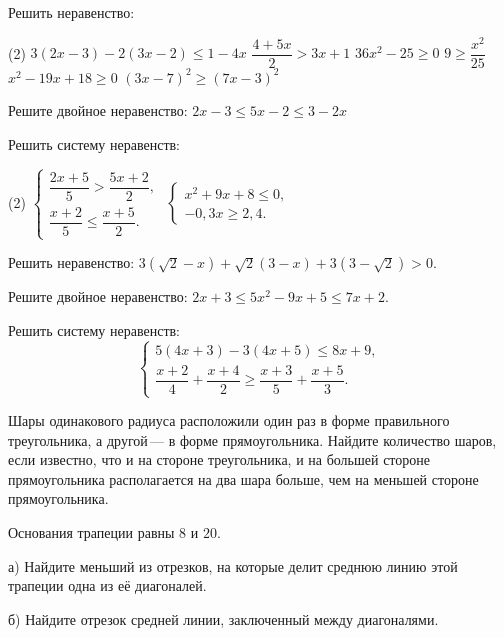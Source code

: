 \begin{class}[number=5]
	\begin{listofex}
		\item Решить неравенство:
		\begin{tasks}(2)
			\task \( 3(2x-3)-2(3x-2)\le1-4x \)
			\task \( \dfrac{4+5x}{2}>3x+1 \)
			\task \( 36x^2-25\ge0 \)
			\task \( 9\ge\dfrac{x^2}{25} \)
			\task \( x^2-19x+18\ge0 \)
			\task \( (3x-7)^2\ge(7x-3)^2 \)
		\end{tasks}
		\item Решите двойное неравенство: \( 2x-3\le5x-2\le3-2x \)
		\item Решить систему неравенств:
		\begin{tasks}(2)
			\task
			\( \left\{
			\begin{array}{l}
				\dfrac{2x+5}{5}>\dfrac{5x+2}{2},\\[0.5em]
				\dfrac{x+2}{5}\le\dfrac{x+5}{2}.
			\end{array}
			\right. \)
			\task
			\( \left\{
			\begin{array}{l}
				x^2+9x+8\le0,\\
				-0,3x\ge2,4.
			\end{array}
			\right. \)
		\end{tasks}
		\item Решить неравенство: \( 3(\sqrt{2}-x)+\sqrt{2}(3-x)+3(3-\sqrt{2})>0 \).
			\item Решите двойное неравенство: \( 2x+3\le5x^2-9x+5\le7x+2 \).
			\item Решить систему неравенств:
			\[ \left\{
			\begin{array}{l}
				5(4x+3)-3(4x+5)\le8x+9,\\
				\dfrac{x+2}{4}+\dfrac{x+4}{2}\ge\dfrac{x+3}{5}+\dfrac{x+5}{3}.
			\end{array}
			\right. \]
			\item Шары одинакового радиуса расположили один раз в форме правильного треугольника, а другой --- в форме прямоугольника. Найдите количество шаров, если известно, что и на стороне треугольника, и на большей стороне прямоугольника располагается на два шара больше, чем на меньшей стороне прямоугольника.
		\item Основания трапеции равны \( 8 \) и \( 20 \).
		
		а) Найдите меньший из отрезков, на которые делит среднюю линию этой трапеции одна из её диагоналей.
		
		б) Найдите отрезок средней линии, заключенный между диагоналями.
	\end{listofex}
\end{class}
